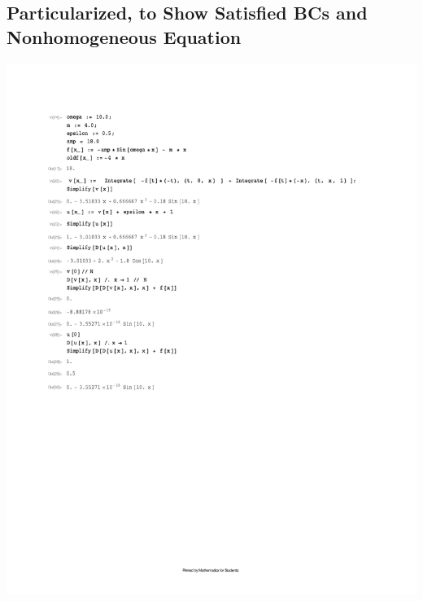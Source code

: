 \documentclass[10pt]{article}
\begin{document}
\subsection{Particularized, to Show Satisfied BCs and Nonhomogeneous Equation}
\includegraphics[width=\columnwidth,keepaspectratio=true]{hw7-mathematica-particular.pdf}
\end{document}
